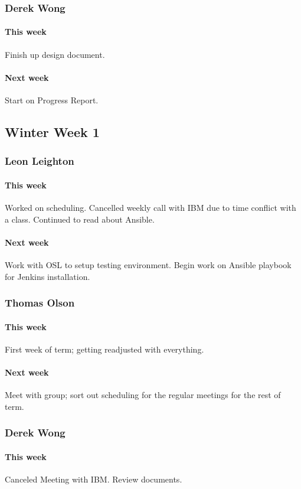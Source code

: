 \documentclass[10pt,letterpaper,onecolumn,draftclsnofoot]{IEEEtran}
\begin{document}
\subsubsection{Derek Wong}
\paragraph{This week}Finish up design document.
\paragraph{Next week}Start on Progress Report.

\subsection{Winter Week 1}
\subsubsection{Leon Leighton}
\paragraph{This week}Worked on scheduling. Cancelled weekly call with IBM due to time conflict with a class.  
Continued to read about Ansible.
\paragraph{Next week}Work with OSL to setup testing environment.  
Begin work on Ansible playbook for Jenkins installation.


\subsubsection{Thomas Olson}
\paragraph{This week}First week of term; getting readjusted with everything.
\paragraph{Next week}Meet with group; sort out scheduling for the regular meetings for the rest of term.


\subsubsection{Derek Wong}
\paragraph{This week}Canceled Meeting with IBM\@. Review documents.
\end{document}
